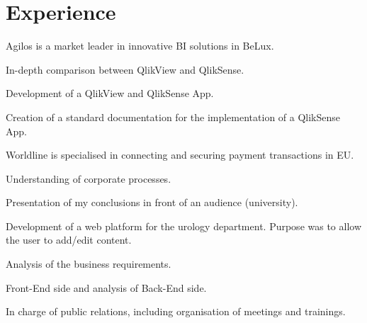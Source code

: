 \documentclass[letterpaper]{my-resume}
\begin{document}

\begin{minipage}[t]{0.66\textwidth} 


\section{Experience}


Agilos is a market leader in innovative BI solutions in BeLux.
\vspace{\topsep} %
\begin{tightitemize}
\item In-depth comparison between QlikView and QlikSense.
\item Development of a QlikView and QlikSense App.
\item Creation of a standard documentation for the implementation of a QlikSense App.
\end{tightitemize}

\sectionspace



Worldline is specialised in connecting and securing payment transactions in EU.
\begin{tightitemize}
\item Understanding of corporate processes.
\item Presentation of my conclusions in front of an audience (university).
\end{tightitemize}

\sectionspace



Development of a web platform for the urology department. Purpose was to allow the user to add/edit content.
\begin{tightitemize}
\item Analysis of the business requirements.
\item Front-End side and analysis of Back-End side.
\item In charge of public relations, including organisation of meetings and trainings.


\end{tightitemize}
\end{minipage}
\end{document}
